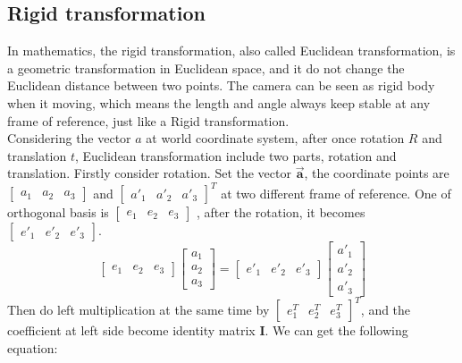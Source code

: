 \subsection{Rigid transformation}
In mathematics, the rigid transformation, also called Euclidean transformation, is a geometric transformation in  Euclidean space, and it do not change the Euclidean distance between two points. The camera can be seen as rigid body when it moving, which means the length and angle always keep stable at any frame of reference, just like a Rigid transformation.\\
Considering the vector $a$ at world coordinate system, after once rotation $R$ and translation $t$, 
Euclidean transformation include two parts, rotation and translation. Firstly consider rotation. Set the vector $\pmb{\vec{a}}$, the coordinate points are
$
    \begin{bmatrix} 
        a_1 & a_2 & a_3
    \end{bmatrix} 
$
and 
$
\left[
\begin{matrix} 
    a'_1 & a'_2 & a'_3
\end{matrix} 
\right]^T
$ at two different frame of reference. One of orthogonal basis is 
$
\begin{bmatrix} 
    e_1 & e_2 & e_3
\end{bmatrix} 
$
, after the rotation, it becomes 
$
    \begin{bmatrix} 
        e'_1 & e'_2 & e'_3
    \end{bmatrix} 
$.
$$
   \begin{bmatrix}
        e_1 & e_2 & e_3
   \end{bmatrix} 
   \begin{bmatrix}
    a_1\\
    a_2\\
    a_3
    \end{bmatrix}
    =
    \begin{bmatrix}
    e'_1 & e'_2 & e'_3
    \end{bmatrix}
    \begin{bmatrix}
    a'_1\\
    a'_2\\
    a'_3
    \end{bmatrix}
$$
Then do left multiplication at the same time by 
$
    \left[
    \begin{matrix}
    e_1^T & e_2^T & e_3^T
    \end{matrix}
    \right]^T
$, and the coefficient at left side become identity matrix $\pmb{I}$. We can get the following equation:
